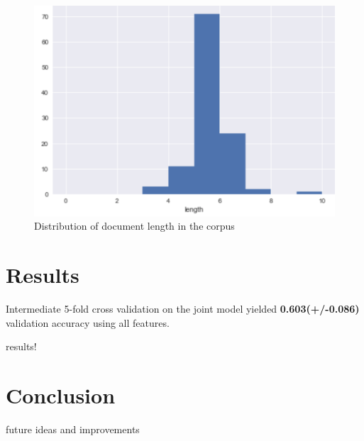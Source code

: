 \documentclass[onecolumn]{article}
\begin{document}
\begin{figure}[h]
    \centering
    \includegraphics[width=0.4\linewidth]{fig/doc-length.png}
    \caption{Distribution of document length in the corpus}
    \label{fig:length}
        \end{figure}




\section{Results}
Intermediate 5-fold cross validation on the joint model yielded \textbf{0.603(+/-0.086)} validation accuracy using all features. 

results!

\section{Conclusion}
future ideas and improvements

\nocite{*}


\end{document}
